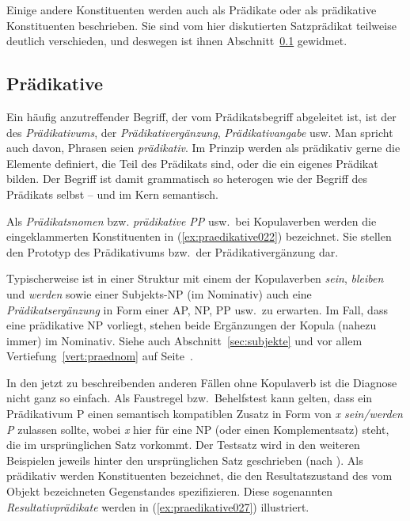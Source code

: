 Einige andere Konstituenten werden auch als Prädikate oder als prädikative Konstituenten beschrieben.
Sie sind vom hier diskutierten Satzprädikat teilweise deutlich verschieden, und deswegen ist ihnen Abschnitt~\ref{sec:praedikative} gewidmet.

\subsection{Prädikative}
\label{sec:praedikative}

Ein häufig anzutreffender Begriff, der vom Prädikatsbegriff abgeleitet ist, ist der des \textit{Prädikativums}, der \textit{Prädikativergänzung}, \textit{Prädikativangabe} usw.
Man spricht auch davon, Phrasen seien \textit{prädikativ}.
Im Prinzip werden als prädikativ gerne die Elemente definiert, die Teil des Prädikats sind, oder die ein eigenes Prädikat bilden.
Der Begriff ist damit grammatisch so heterogen wie der Begriff des Prädikats selbst -- und im Kern semantisch.


Als \textit{Prädikatsnomen} bzw. \textit{prädikative PP} usw.\ bei Kopulaverben werden die eingeklammerten Konstituenten in (\ref{ex:praedikative022}) bezeichnet.
Sie stellen den Prototyp des Prädikativums bzw.\ der Prädikativergänzung dar.

\begin{exe}
  \ex\label{ex:praedikative022}
  \begin{xlist}
  \end{xlist}
\end{exe}

Typischerweise ist in einer Struktur mit einem der Kopulaverben \textit{sein}, \textit{bleiben} und \textit{werden} sowie einer Subjekts-NP (im Nominativ) auch eine \textit{Prädikatsergänzung} in Form einer AP, NP, PP usw.\ zu erwarten.
Im Fall, dass eine prädikative NP vorliegt, stehen beide Ergänzungen der Kopula (nahezu immer) im Nominativ.
Siehe auch Abschnitt~\ref{sec:subjekte} und vor allem Vertiefung~\ref{vert:praednom} auf Seite~\pageref{vert:praednom}.

In den jetzt zu beschreibenden anderen Fällen ohne Kopulaverb ist die Diagnose nicht ganz so einfach.
Als Faustregel bzw.\ Behelfstest kann gelten, dass ein Prädikativum P einen semantisch kompatiblen Zusatz in Form von \textit{x sein/werden P} zulassen sollte, wobei \textit{x} hier für eine NP (oder einen Komplementsatz) steht, die im ursprünglichen Satz vorkommt.
Der Testsatz wird in den weiteren Beispielen jeweils hinter den ursprünglichen Satz geschrieben (nach \Folgt).
Als prädikativ werden \zB Konstituenten bezeichnet, die den Resultatszustand des vom Objekt bezeichneten Gegenstandes spezifizieren.
Diese sogenannten \textit{Resultativprädikate} werden in (\ref{ex:praedikative027}) illustriert.

